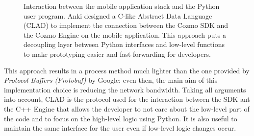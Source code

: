 \begin{figure}
{
	}
	\caption[Interaction Application/PC]{Interaction between the mobile application stack and the Python user program. Anki designed a C-like Abstract Data Language (CLAD) to implement the connection between the Cozmo SDK and the Cozmo Engine on the mobile application. This approach puts a decoupling layer between Python interfaces and low-level functions to make prototyping easier and fast-forwarding for developers. \cite{mellon2017cognitive}}
	\label{fig:cozmotear2}
\end{figure}

This approach results in a process method much lighter than the one provided by \textit{Protocol Buffers (Protobuf)} by Google: even then, the main aim of this implementation choice is reducing the network bandwidth.
Taking all arguments into account, CLAD is the protocol used for the interaction between the SDK ant the C++ Engine that allows the developer to not care about the low-level part of the code and to focus on the high-level logic using Python. It is also useful to maintain the same interface for the user even if low-level logic changes occur.

